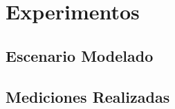 \section{Experimentos}\label{sec:experiments}
\subsection{Escenario Modelado}
\subsection{Mediciones Realizadas}